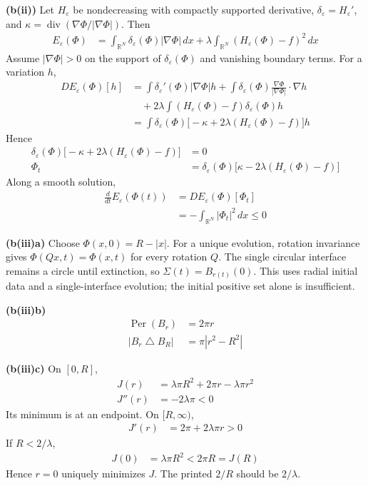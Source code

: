 \documentclass[12pt,letterpaper]{article}
\newcommand{\R}{\mathbb R}
\newcommand{\diver}{\operatorname{div}}
\newcommand{\eps}{\varepsilon}
\newcommand{\partlabel}[1]{\par\medskip\noindent\textbf{(#1)}\enspace}
\begin{document}
\partlabel{b(ii)}
Let $H_\eps$ be nondecreasing with compactly supported derivative,
$\delta_\eps=H_\eps'$, and $\kappa=\diver(\nabla\Phi/|\nabla\Phi|)$. Then
\begin{align*}
 E_\eps(\Phi)
 &=\int_{\R^N}\delta_\eps(\Phi)|\nabla\Phi|\,dx
   +\lambda\int_{\R^N}(H_\eps(\Phi)-f)^2\,dx
\end{align*}
Assume $|\nabla\Phi|>0$ on the support of $\delta_\eps(\Phi)$ and
vanishing boundary terms. For a variation $h$,
\begin{align*}
 DE_\eps(\Phi)[h]
 &=\int\delta_\eps'(\Phi)|\nabla\Phi|h
   +\int\delta_\eps(\Phi)
       \frac{\nabla\Phi}{|\nabla\Phi|}\cdot\nabla h\\
 &\quad+2\lambda\int(H_\eps(\Phi)-f)\delta_\eps(\Phi)h\\
 &=\int\delta_\eps(\Phi)
       \bigl[-\kappa+2\lambda(H_\eps(\Phi)-f)\bigr]h
\end{align*}
Hence
\begin{align*}
 \delta_\eps(\Phi)
   \bigl[-\kappa+2\lambda(H_\eps(\Phi)-f)\bigr]&=0\\
 \Phi_t&=\delta_\eps(\Phi)
   \bigl[\kappa-2\lambda(H_\eps(\Phi)-f)\bigr]
\end{align*}
Along a smooth solution,
\begin{align*}
 \frac{d}{dt}E_\eps(\Phi(t))
 &=DE_\eps(\Phi)[\Phi_t]\\
 &=-\int_{\R^N}|\Phi_t|^2\,dx\leq0
\end{align*}

\partlabel{b(iii)a}
Choose $\Phi(x,0)=R-|x|$. For a unique evolution, rotation invariance
gives $\Phi(Qx,t)=\Phi(x,t)$ for every rotation $Q$.
The single circular interface remains a circle until extinction,
so $\Sigma(t)=B_{r(t)}(0)$. This uses radial initial data and a
single-interface evolution; the initial positive set alone is insufficient.

\partlabel{b(iii)b}
\begin{align*}
 \operatorname{Per}(B_r)&=2\pi r\\
 |B_r\mathbin\triangle B_R|&=\pi|r^2-R^2|
\end{align*}

\partlabel{b(iii)c}
On $[0,R]$,
\begin{align*}
 J(r)&=\lambda\pi R^2+2\pi r-\lambda\pi r^2\\
 J''(r)&=-2\lambda\pi<0
\end{align*}
Its minimum is at an endpoint. On $[R,\infty)$,
\begin{align*}
 J'(r)&=2\pi+2\lambda\pi r>0
\end{align*}
If $R<2/\lambda$,
\begin{align*}
 J(0)&=\lambda\pi R^2<2\pi R=J(R)
\end{align*}
Hence $r=0$ uniquely minimizes $J$. The printed $2/R$ should be
$2/\lambda$.
\end{document}
